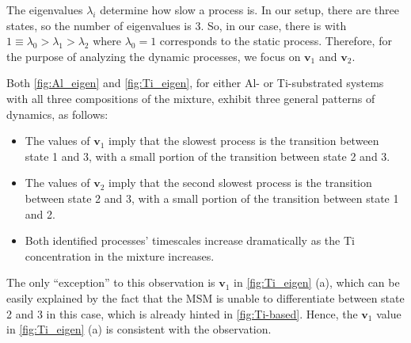 The eigenvalues $\lambda_i$ determine how slow a process is. In our setup, there are three states, so the number of eigenvalues is $3$. So, in our case, there is with $1 \equiv \lambda_0 > \lambda_1 > \lambda_2$ where $\lambda_0 = 1$ corresponds to the static process. Therefore, for the purpose of analyzing the dynamic processes, we focus on $\mathbf{v}_1$ and $\mathbf{v}_2$. 

Both \cref{fig:Al_eigen} and \cref{fig:Ti_eigen}, for either Al- or Ti-substrated systems with all three compositions of the mixture, exhibit three general patterns of dynamics, as follows:
\begin{itemize}
    \item The values of $\mathbf{v}_1$ imply that the slowest process is the transition between state 1 and 3, with a small portion of the transition between state 2 and 3.
    \item The values of $\mathbf{v}_2$ imply that the second slowest process is the transition between state 2 and 3, with a small portion of the transition between state 1 and 2.
    \item Both identified processes' timescales increase dramatically as the Ti concentration in the mixture increases.
\end{itemize}
The only ``exception'' to this observation is $\mathbf{v}_1$ in \cref{fig:Ti_eigen} (a), which can be easily explained by the fact that the MSM is unable to differentiate between state 2 and 3 in this case, which is already hinted in \cref{fig:Ti-based}. Hence, the $\mathbf{v}_1$ value in \cref{fig:Ti_eigen} (a) is consistent with the observation.


